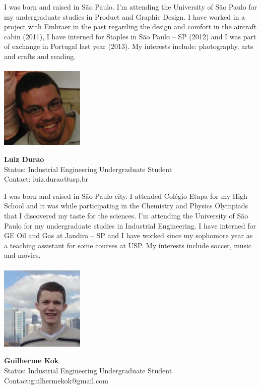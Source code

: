 I was born and raised in S\~{a}o Paulo. I'm attending the University of S\~{a}o Paulo for my undergraduate studies in Product and Graphic Design. I have worked in a project with Embraer in the past regarding the design and comfort in the aircraft cabin (2011), I have interned for Staples in S\~{a}o Paulo – SP (2012) and I was part of exchange in Portugal last year (2013). My interests include: photography, arts and crafts and reading.
\\ \\



\noindent \includegraphics[width=40mm]{images/image015}
\parbox[b]{0.6\textwidth}{\textbf{Luiz Durao}\\
Status: Industrial Engineering Undergraduate Student \\
Contact: luiz.durao@usp.br  \\
}

I was born and raised in S\~{a}o Paulo city. I attended Colégio Etapa for my High School and it was while participating in the Chemistry and Physics Olympiads that I discovered my taste for the sciences. I'm attending the University of S\~{a}o Paulo for my undergraduate studies in Industrial Engineering. I have interned for GE Oil and Gas at Jandira – SP and I have worked since my sophomore year as a teaching assistant for some courses at USP. My interests include soccer, music and movies.
\\ \\

\noindent \includegraphics[width=40mm]{images/image016}
\parbox[b]{0.6\textwidth}{\textbf{Guilherme Kok}\\
Status: Industrial Engineering Undergraduate Student \\
Contact:guilhermekok@gmail.com  \\
}

